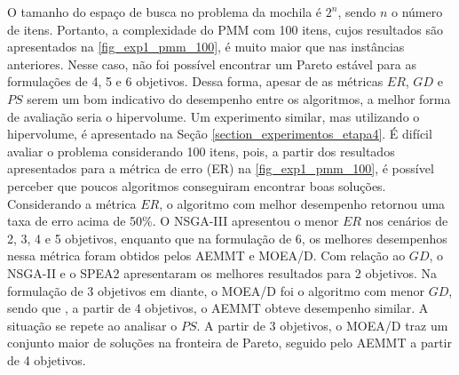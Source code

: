 O tamanho do espaço de busca no problema da mochila é $2^n$, sendo $n$ o número de itens. Portanto, a complexidade do PMM com 100 itens, cujos resultados são apresentados na \autoref{fig_exp1_pmm_100}, é muito maior que nas instâncias anteriores. Nesse caso, não foi possível encontrar um Pareto estável para as formulações de 4, 5 e 6 objetivos. Dessa forma, apesar de as métricas $ER$, $GD$ e $PS$ serem um bom indicativo do desempenho entre os algoritmos, a melhor forma de avaliação seria o hipervolume. Um experimento similar, mas utilizando o hipervolume, é apresentado na Seção \ref{section_experimentos_etapa4}. É difícil avaliar o problema considerando 100 itens, pois, a partir dos resultados apresentados para a métrica de erro (ER) na \autoref{fig_exp1_pmm_100}, é possível perceber que poucos algoritmos conseguiram encontrar boas soluções. Considerando a métrica $ER$, o algoritmo com melhor desempenho retornou uma taxa de erro acima de 50\%. O NSGA-III apresentou o menor $ER$ nos cenários de 2, 3, 4 e 5 objetivos, enquanto que na formulação de 6, os melhores desempenhos nessa métrica foram obtidos pelos AEMMT e MOEA/D. Com relação ao $GD$, o NSGA-II e o SPEA2 apresentaram os melhores resultados para 2 objetivos. Na formulação de 3 objetivos em diante, o MOEA/D foi o algoritmo com menor $GD$, sendo que , a partir de 4 objetivos, o AEMMT obteve desempenho similar. A situação se repete ao analisar o $PS$. A partir de 3 objetivos, o MOEA/D traz um conjunto maior de soluções na fronteira de Pareto, seguido pelo AEMMT a partir de 4 objetivos.

